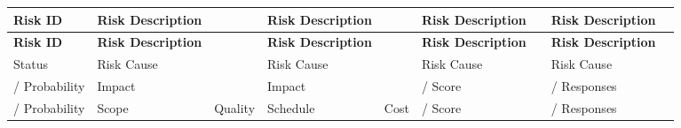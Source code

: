 \documentclass[10pt,letterpaper]{article}
\renewcommand\arraystretch{1.25}
\begin{document}
\begin{landscape}
\begin{center}
\begingroup
\setlength\tabcolsep{2.0pt}
\tiny
\renewcommand\arraystretch{1.55}
\begin{longtable}{|>{\raggedright\arraybackslash}p{0.898in}|>{\raggedright\arraybackslash}p{0.898in}|>{\raggedright\arraybackslash}p{0.898in}|>{\raggedright\arraybackslash}p{0.898in}|>{\raggedright\arraybackslash}p{0.898in}|>{\raggedright\arraybackslash}p{0.898in}|>{\raggedright\arraybackslash}p{0.898in}|>{\raggedright\arraybackslash}p{0.898in}|>{\raggedright\arraybackslash}p{0.898in}|}
\hline
\rowcolor{light}
\textbf{Risk ID} & \textbf{Risk Description} & \rule{0pt}{11pt}\hspace{0pt} & \textbf{Risk Description} & \rule{0pt}{11pt}\hspace{0pt} & \textbf{Risk Description} & \rule{0pt}{11pt}\hspace{0pt} & \textbf{Risk Description} & \rule{0pt}{11pt}\hspace{0pt} \\ \hline
\endfirsthead
\hline\rowcolor{light} \textbf{Risk ID} & \textbf{Risk Description} & \rule{0pt}{11pt}\hspace{0pt} & \textbf{Risk Description} & \rule{0pt}{11pt}\hspace{0pt} & \textbf{Risk Description} & \rule{0pt}{11pt}\hspace{0pt} & \textbf{Risk Description} & \rule{0pt}{11pt}\hspace{0pt} \\ \hline
\endhead
Status & Risk Cause & \rule{0pt}{11pt}\hspace{0pt} & Risk Cause & \rule{0pt}{11pt}\hspace{0pt} & Risk Cause & \rule{0pt}{11pt}\hspace{0pt} & Risk Cause & \rule{0pt}{11pt}\hspace{0pt} \\ \hline
/ Probability & Impact & \rule{0pt}{11pt}\hspace{0pt} & Impact & \rule{0pt}{11pt}\hspace{0pt} & / Score & \rule{0pt}{11pt}\hspace{0pt} & / Responses & \rule{0pt}{11pt}\hspace{0pt} \\ \hline
/ Probability & Scope & Quality & Schedule & Cost & / Score & \rule{0pt}{11pt}\hspace{0pt} & / Responses & \rule{0pt}{11pt}\hspace{0pt} \\ \hline

\end{longtable}
\end{center}
\end{landscape}
\end{document}
